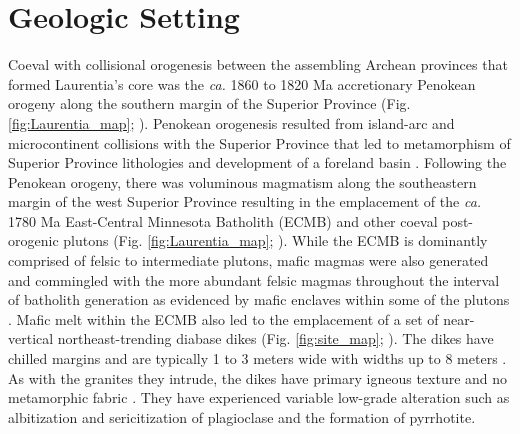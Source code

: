 \documentclass[draft]{agujournal2019}
\begin{document}
\section{Geologic Setting}

Coeval with collisional orogenesis between the assembling Archean provinces that formed Laurentia's core was the \textit{ca.} 1860 to 1820 Ma accretionary Penokean orogeny along the southern margin of the Superior Province (Fig. \ref{fig:Laurentia_map}; ). Penokean orogenesis resulted from island-arc and microcontinent collisions with the Superior Province that led to metamorphism of Superior Province lithologies and development of a foreland basin \cite{Schulz2007a, Holm2019a}. Following the Penokean orogeny, there was voluminous magmatism along the southeastern margin of the west Superior Province resulting in the emplacement of the \textit{ca.} 1780 Ma East-Central Minnesota Batholith (ECMB) and other coeval post-orogenic plutons (Fig. \ref{fig:Laurentia_map}; ). While the ECMB is dominantly comprised of felsic to intermediate plutons, mafic magmas were also generated and commingled with the more abundant felsic magmas throughout the interval of batholith generation as evidenced by mafic enclaves within some of the plutons \cite{Boerboom2005b, Boerboom2011b, Schmitz2018a}. Mafic melt within the ECMB also led to the emplacement of a set of near-vertical northeast-trending diabase dikes (Fig. \ref{fig:site_map}; ).  The dikes have chilled margins and are typically 1 to 3 meters wide with widths up to 8 meters \cite{Boerboom2005b}. As with the granites they intrude, the dikes have primary igneous texture and no metamorphic fabric \cite{Boerboom2005b}. They have experienced variable low-grade alteration such as albitization and sericitization of plagioclase and the formation of pyrrhotite. 
\end{document}
